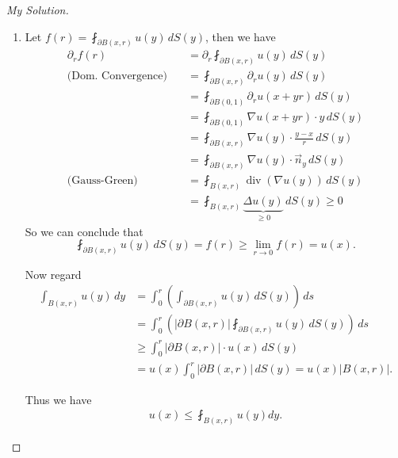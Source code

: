 \documentclass{report}
\theoremstyle{tommy}
\renewcommand\div{\operatorname{div}}
\begin{document}
\begin{proof}[My Solution]
  \begin{enumerate}[label=\alph*)]
    \item Let \(f(r) = \fint_{\partial B(x, r)} u(y) \, dS(y)\), then we have
      \begin{align*}
        \partial_r f(r)
        &= \partial_r \fint_{\partial B(x,r)} u(y) \, dS(y) \\
        \text{(Dom. Convergence)} \quad &= \fint_{\partial B(x, r)} \partial_r u(y) \, dS(y) \\
        &= \fint_{\partial B(0,1)} \partial_r u(x+yr) \, dS(y) \\
        &= \fint_{\partial B(0,1)} \nabla u(x+yr) \cdot y \, dS(y) \\
        &= \fint_{\partial B(x, r)} \nabla u(y) \cdot \frac{y-x}{r} \, dS(y) \\
        &= \fint_{\partial B(x,r)} \nabla u(y) \cdot \vec{n}_y \, dS(y) \\
        \text{(Gauss-Green)} \quad &= \fint_{B(x, r)} \div(\nabla u(y)) \, dS(y) \\
        &= \fint_{B(x,r)} \underbrace{\Delta u(y)}_{\ge 0} \, dS(y) \ge 0
      \end{align*}
      So we can conclude that
      \[\fint_{\partial B(x, r)} u(y) \, dS(y) = f(r) \ge \lim_{r \to 0} f(r) = u(x).\]

      Now regard
      \begin{align*}
        \int_{B(x,r)} u(y) \, dy 
        &= \int_0^r \left(\int_{\partial B(x, r)} u(y) \, dS(y)\right) \, ds \\
        &= \int_0^r \left(|\partial B(x, r)| \fint_{\partial B(x,r)} u(y) \, dS(y)\right) \, ds \\
        &\ge \int_0^r |\partial B(x, r)| \cdot  u(x) \, dS(y) \\
        &= u(x) \int_0^r |\partial B(x, r)| \, dS(y)
        = u(x) |B(x,r)|.
      \end{align*}

      Thus we have
      \begin{align*}
        u(x) \le \fint_{B(x,r)} u(y) dy.
      \end{align*}


\end{enumerate}
\end{proof}
\end{document}
